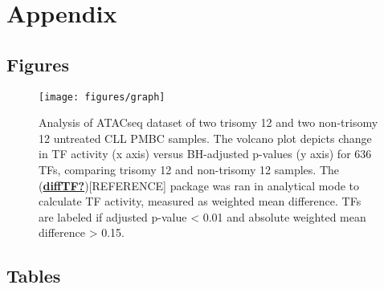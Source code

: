 \documentclass[11pt, a4paper, twosided]{book}
\begin{document}
\newpage

\hypertarget{appendix}{%
\chapter*{Appendix}\label{appendix}}

\hypertarget{figures}{%
\section*{Figures}\label{figures}}


\begin{figure}

{\centering \texttt{[image: figures/graph]} 

}

\caption{Analysis of ATACseq dataset of two trisomy 12 and two non-trisomy 12 untreated CLL PMBC samples. The volcano plot depicts change in TF activity (x axis) versus BH-adjusted p-values (y axis) for 636 TFs, comparing trisomy 12 and non-trisomy 12 samples. The (\protect\hyperlink{ref-diffTF}{\textbf{diffTF?}}){[}REFERENCE{]} package was ran in analytical mode to calculate TF activity, measured as weighted mean difference. TFs are labeled if adjusted p-value \textless{} 0.01 and absolute weighted mean difference \textgreater{} 0.15.}\label{fig:diffTFsmallvolPlot}
\end{figure}
\hypertarget{tables}{%
\section*{Tables}\label{tables}}
\end{document}
